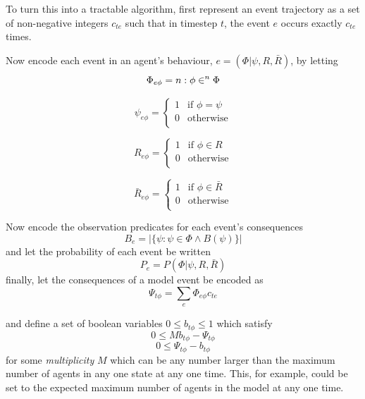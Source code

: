 \documentclass[sigconf]{aamas}
\begin{document}
To turn this into a tractable algorithm, first represent an event trajectory as a set of non-negative integers $c_{te}$ such that in timestep $t$, the event $e$ occurs exactly $c_{te}$ times.

Now encode each event in an agent's behaviour, $e = (\Phi|\psi,R,\bar{R})$, by letting 
\begin{equation}
\Phi_{e\phi} = n: \phi \in^n \Phi\\
\end{equation}

\begin{equation}
\psi_{e\phi} = 
\begin{cases}
1&\text{if } \phi = \psi\\
0&\text{otherwise}\\
\end{cases}
\end{equation}

\begin{equation}
R_{e\phi} =
\begin{cases}
1&\text{if } \phi \in R\\
0&\text{otherwise}\\
\end{cases}
\end{equation}

\begin{equation}
\bar{R}_{e\phi} =
\begin{cases}
1&\text{if } \phi \in \bar{R}\\
0&\text{otherwise}\\
\end{cases}
\end{equation}

Now encode the observation predicates for each event's consequences
\begin{equation}
B_e = |\{\psi: \psi\in\Phi \wedge B(\psi)\}|
\end{equation}
and let the probability of each event be written
\[
P_e = P(\Phi|\psi,R,\bar{R})
\]
finally, let the consequences of a model event be encoded as
\begin{equation}
\Psi_{t\phi} = \sum_e\Phi_{e\phi}c_{te}
\label{stateIndicator}
\end{equation}

and define a set of boolean variables $0 \le b_{t\phi} \le 1$ which satisfy
\begin{equation}
0 \le Mb_{t\phi} - \Psi_{t\phi}
\label{bGEconstraint}
\end{equation}
\begin{equation}
0 \le \Psi_{t\phi} - b_{t\phi} 
\label{bLEconstraint}
\end{equation}
for some \textit{multiplicity} $M$ which can be any number larger than the maximum number of agents in any one state at any one time. This, for example, could be set to the expected maximum number of agents in the model at any one time.
\end{document}

